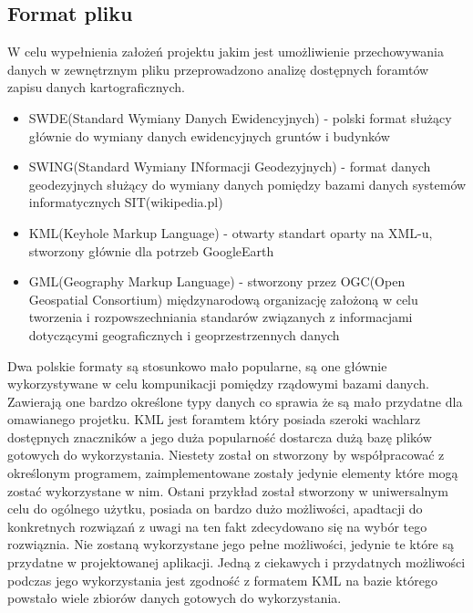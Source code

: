 \subsection{Format pliku}
\label{subsec:fileformat}

W celu wypełnienia założeń projektu jakim jest umożliwienie przechowywania danych w zewnętrznym pliku przeprowadzono analizę dostępnych foramtów zapisu danych kartograficznych.

\begin{itemize}

\item
SWDE(Standard Wymiany Danych Ewidencyjnych) - polski format służący głównie do wymiany danych ewidencyjnych gruntów i budynków

\item
SWING(Standard Wymiany INformacji Geodezyjnych) - format danych geodezyjnych służący do wymiany danych pomiędzy bazami danych systemów informatycznych SIT(wikipedia.pl)

\item
KML(Keyhole Markup Language) - otwarty standart oparty na XML-u, stworzony głównie dla potrzeb GoogleEarth

\item
GML(Geography Markup Language) - stworzony przez OGC(Open Geospatial Consortium) międzynarodową organizację założoną w celu tworzenia i rozpowszechniania standarów związanych z informacjami dotyczącymi geograficznych i geoprzestrzennych danych

\end{itemize}

Dwa polskie formaty są stosunkowo mało popularne, są one głównie wykorzystywane w celu kompunikacji pomiędzy rządowymi bazami danych. Zawierają one bardzo określone typy danych co sprawia że są mało przydatne dla omawianego projetku. KML jest foramtem który posiada szeroki wachlarz dostępnych znaczników a jego duża popularność dostarcza dużą bazę plików gotowych do wykorzystania. Niestety został on stworzony by współpracować z określonym programem, zaimplementowane zostały jedynie elementy które mogą zostać wykorzystane w nim. Ostani przykład został stworzony w uniwersalnym celu do ogólnego użytku, posiada on bardzo dużo możliwości, apadtacji do konkretnych rozwiązań\cite{gml} z uwagi na ten fakt zdecydowano się na wybór tego rozwiąznia. Nie zostaną wykorzystane jego pełne możliwości, jedynie te które są przydatne w projektowanej aplikacji.
Jedną z ciekawych i przydatnych możliwości podczas jego wykorzystania jest zgodność z formatem KML na bazie którego powstało wiele zbiorów danych gotowych do wykorzystania.

